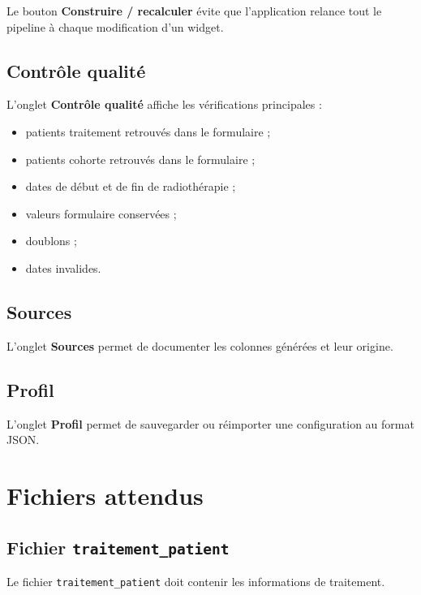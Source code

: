 \documentclass[11pt,a4paper]{article}
\begin{document}
Le bouton \textbf{Construire / recalculer} évite que l'application relance tout le
pipeline à chaque modification d'un widget.

\subsection{Contrôle qualité}

L'onglet \textbf{Contrôle qualité} affiche les vérifications principales :

\begin{itemize}
    \item patients traitement retrouvés dans le formulaire ;
    \item patients cohorte retrouvés dans le formulaire ;
    \item dates de début et de fin de radiothérapie ;
    \item valeurs formulaire conservées ;
    \item doublons ;
    \item dates invalides.
\end{itemize}

\subsection{Sources}

L'onglet \textbf{Sources} permet de documenter les colonnes générées et leur
origine.

\subsection{Profil}

L'onglet \textbf{Profil} permet de sauvegarder ou réimporter une configuration au
format JSON.

\section{Fichiers attendus}

\subsection{Fichier \texttt{traitement\_patient}}

Le fichier \texttt{traitement\_patient} doit contenir les informations de
traitement.
\end{document}
